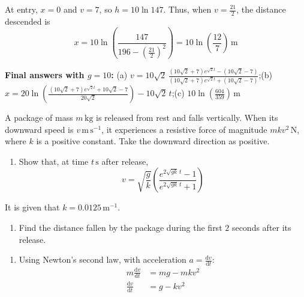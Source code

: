 \documentclass[leqno]{article}
\begin{document}
\begin{enumerate}[
  label=\textbf{\arabic*.},
  leftmargin=*,
  topsep=0pt,
  partopsep=0pt,
  parsep=0pt
]
\begin{djsSolution}
\begin{enumerate}[label=\textbf{(\alph*)}, start=1]
At entry, \(x=0\) and \(v=7\), so \(h=10\ln147\). Thus, when \(v=\frac{21}{2}\), the distance descended is
\[
x=10\ln\left(\frac{147}{196-\left(\frac{21}{2}\right)^2}\right)=10\ln\left(\frac{12}{7}\right)\,\mathrm{m}
\]
\end{enumerate}
{\raggedright\par\medskip\noindent\textbf{Final answers with \(g = 10\):} (a) \(v=10\sqrt{2}\,\frac{(10\sqrt{2}+7)e^{\sqrt{2}t}-(10\sqrt{2}-7)}{(10\sqrt{2}+7)e^{\sqrt{2}t}+(10\sqrt{2}-7)}\);\quad (b)~\(x=20\ln\left(\frac{(10\sqrt{2}+7)e^{\sqrt{2}t}+10\sqrt{2}-7}{20\sqrt{2}}\right)-10\sqrt{2}\,t\);\quad (c) \(10\ln\left(\frac{604}{359}\right)\,\mathrm{m}\)\par}
\end{djsSolution}

\newpage

\questionitem

A package of mass $m\,\mathrm{kg}$ is released from rest and falls vertically. When its downward speed is $v\,\mathrm{m\,s^{-1}}$, it experiences a resistive force of magnitude $mkv^2\,\mathrm{N}$, where $k$ is a positive constant. Take the downward direction as positive. \\

\begin{enumerate}[label=\textbf{(\alph*)}]
  \item Show that, at time $t\,\mathrm{s}$ after release,
  \[
  v=\sqrt{\frac{g}{k}}\left(\frac{e^{2\sqrt{gk}\,t}-1}{e^{2\sqrt{gk}\,t}+1}\right)
  \]
\end{enumerate}
It is given that $k=0.0125\,\mathrm{m^{-1}}$. \\
\begin{enumerate}[label=\textbf{(\alph*)}, resume]
  \item Find the distance fallen by the package during the first $2$ seconds after its release.  \\
\end{enumerate}

\vspace*{10pt}

\begin{djsSolution}
\begin{enumerate}[label=\textbf{(\alph*)}, start=1]
\item Using Newton's second law, with acceleration \(a=\frac{\mathrm{d}v}{\mathrm{d}t}\):
\begin{align*}
m\frac{\mathrm{d}v}{\mathrm{d}t}&=mg-mkv^2\\
\frac{\mathrm{d}v}{\mathrm{d}t}&=g-kv^2
\end{align*}


\end{enumerate}
\end{djsSolution}
\end{enumerate}
\end{document}
